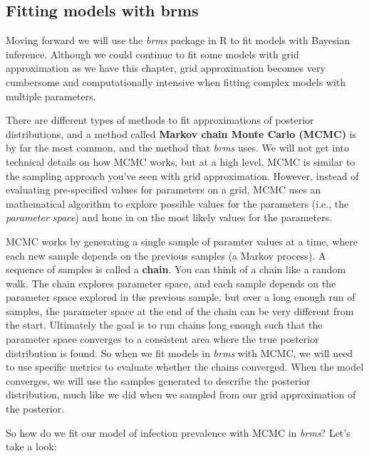 \documentclass[
]{book}
\begin{document}
\subsection{Fitting models with brms}\label{fitting-models-with-brms}

Moving forward we will use the \emph{brms} package in R to fit models with Bayesian inference. Although we could continue to fit some models with grid approximation as we have this chapter, grid approximation becomes very cumbersome and computationally intensive when fitting complex models with multiple parameters.

There are different types of methods to fit approximations of posterior distributions, and a method called \textbf{Markov chain Monte Carlo (MCMC)} is by far the most common, and the method that \emph{brms} uses. We will not get into technical details on how MCMC works, but at a high level, MCMC is similar to the sampling approach you've seen with grid approximation. However, instead of evaluating pre-specified values for parameters on a grid, MCMC uses an mathematical algorithm to explore possible values for the parameters (i.e., the \emph{parameter space}) and hone in on the most likely values for the parameters.

MCMC works by generating a single sample of paramter values at a time, where each new sample depends on the previous samples (a Markov process). A sequence of samples is called a \textbf{chain}. You can think of a chain like a random walk. The chain explores parameter space, and each sample depends on the parameter space explored in the previous sample, but over a long enough run of samples, the parameter space at the end of the chain can be very different from the start. Ultimately the goal is to run chains long enough such that the parameter space converges to a consistent area where the true posterior distribution is found. So when we fit models in \emph{brms} with MCMC, we will need to use specific metrics to evaluate whether the chains converged. When the model converges, we will use the samples generated to describe the posterior distribution, much like we did when we sampled from our grid approximation of the posterior.

So how do we fit our model of infection prevalence with MCMC in \emph{brms}? Let's take a look:
\end{document}
